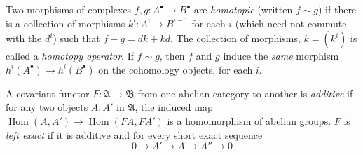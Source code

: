 {Two morphisms of complexes $f,g\colon A^\bullet\to B^\bullet$ are \emph{homotopic} (written $f\sim g$) if there is a collection of morphisms $k^i\colon A^i\to B^{i-1}$ for each $i$ (which need not commute with the $d^i$) such that $f-g=dk+kd$. The collection of morphisms, $k=(k^i)$ is called a \emph{homotopy operator}. If $f\sim g$, then $f$ and $g$ induce the \emph{same} morphism $h^i(A^\bullet)\to h^i(B^\bullet)$ on the cohomology objects, for each $i$.

A covariant functor $F\colon\mathfrak A\to\mathfrak B$ from one abelian category to another is \emph{additive} if for any two objects $A,A'$ in $\mathfrak A$, the induced map $\operatorname{Hom}(A,A')\to\operatorname{Hom}(FA,FA')$ is a homomorphism of abelian groups. $F$ is \emph{left exact} if it is additive and for every short exact sequence
\[
  0\to A'\to A\to A''\to0
\]
}
